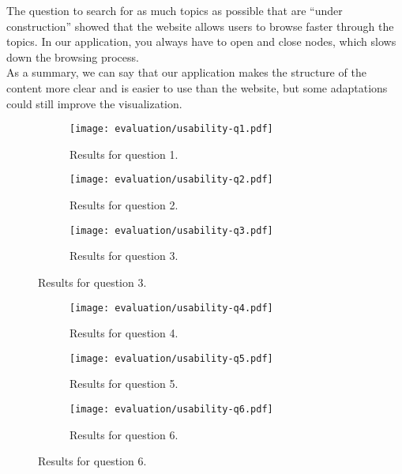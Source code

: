 The question to search for as much topics as possible that are ``under construction'' showed that the website allows users to browse faster through the topics. In our application, you always have to open and close nodes, which slows down the browsing process.\\

As a summary, we can say that our application makes the structure of the content more clear and is easier to use than the website, but some adaptations could still improve the visualization.

\begin{figure}[H]
	\centering
	\begin{subfigure}{.8\textwidth}
  		\centering
  		\texttt{[image: evaluation/usability-q1.pdf]}
  		\caption{Results for question 1.}
	\end{subfigure}\par\bigskip
	
	\begin{subfigure}{.8\textwidth}
  		\centering
  		\texttt{[image: evaluation/usability-q2.pdf]}
  		\caption{Results for question 2.}
	\end{subfigure}\par\bigskip
	
	\begin{subfigure}{.8\textwidth}
  		\centering
  		\texttt{[image: evaluation/usability-q3.pdf]}
  		\caption{Results for question 3.}
	\end{subfigure}
\end{figure}

\begin{figure}[H]\ContinuedFloat
	\centering	
	\begin{subfigure}{.8\textwidth}
  		\centering
  		\texttt{[image: evaluation/usability-q4.pdf]}
  		\caption{Results for question 4.}
	\end{subfigure}\par\bigskip
	
	\begin{subfigure}{.8\textwidth}
  		\centering
  		\texttt{[image: evaluation/usability-q5.pdf]}
  		\caption{Results for question 5.}
	\end{subfigure}\par\bigskip
	
	\begin{subfigure}{.8\textwidth}
  		\centering
  		\texttt{[image: evaluation/usability-q6.pdf]}
  		\caption{Results for question 6.}
	\end{subfigure}
\end{figure}

